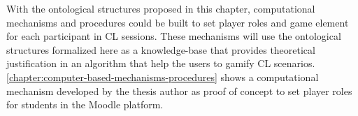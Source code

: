 With the ontological structures proposed in this chapter, computational mechanisms and procedures could be built to set player roles and game element for each participant in CL sessions.
These mechanisms will use the ontological structures formalized here as a knowledge-base that provides theoretical justification in an algorithm that help the users to gamify CL scenarios.
\autoref{chapter:computer-based-mechanisms-procedures} shows a computational mechanism developed by the thesis author as proof of concept to set player roles for students in the Moodle platform.


